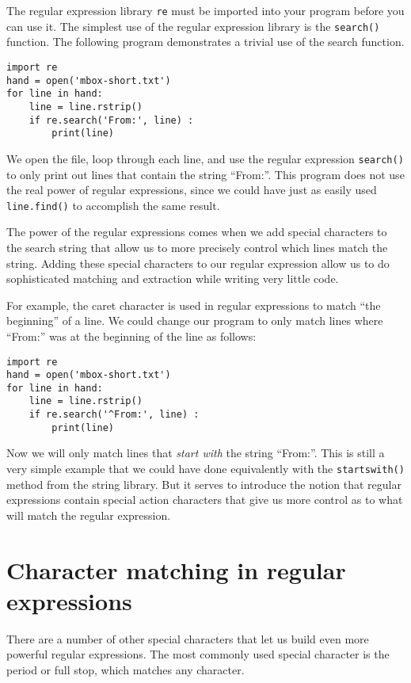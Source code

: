 The regular expression library {\tt re} must be imported into your program before you can use it.
The simplest use of the regular expression library is the {\tt search()} function.  The following
program demonstrates a trivial use of the search function.


\beforeverb
\begin{verbatim}
import re
hand = open('mbox-short.txt')
for line in hand:
    line = line.rstrip()
    if re.search('From:', line) :
        print(line)
\end{verbatim}
\afterverb
%
We open the file, loop through each line, and use the regular expression {\tt search()} to
only print out lines that contain the string ``From:''.   This program does not use the real
power of regular expressions, since we could have just as easily used {\tt line.find()} to
accomplish the same result.

The power of the regular expressions comes when we add special characters to the search string
that allow us to more precisely control which lines match the string.  Adding these special
characters to our regular expression allow us to do sophisticated matching and extraction while
writing very little code.

For example, the caret character is used in regular 
expressions to match ``the beginning'' of a line.
We could change our program to only match 
lines where ``From:'' was at the beginning of the line as follows:

\beforeverb
\begin{verbatim}
import re
hand = open('mbox-short.txt')
for line in hand:
    line = line.rstrip()
    if re.search('^From:', line) :
        print(line)
\end{verbatim}
\afterverb
%
Now we will only match lines that {\em start with} the string ``From:''.  This is still a very
simple example that we could have done equivalently with the {\tt startswith()} method from
the string library.  But it serves to introduce the notion that regular expressions contain
special action characters that give us more control as to what will match the regular expression.

\section{Character matching in regular expressions}

There are a number of other special characters that let us build even more powerful regular
expressions.  The most commonly used special character is the period or full stop, which matches
any character.


